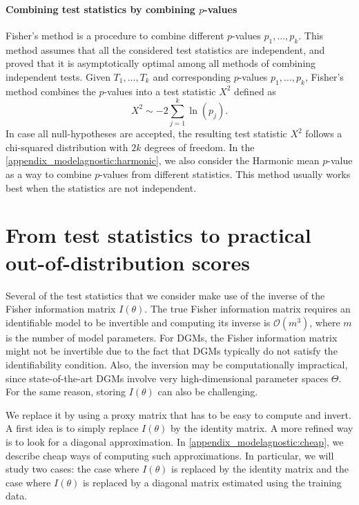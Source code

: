 {\paragraph{Combining test statistics by combining $p$-values}
Fisher's \citeyearpar{fisher_statistical_1925} method is a procedure to combine different $p$-values $p_1,\dots, p_k$. This method assumes that all the considered test statistics are independent, and \textcite{folks_asymptotic_1971} proved that it is asymptotically optimal among all methods of combining independent tests.
%
Given $T_1,\dots, T_k$ and corresponding $p$-values $p_1,\dots, p_k$, Fisher's method combines the $p$-values into a test statistic $X^2$ defined as
\begin{equation}
    \label{eq_modelagnostic:Fisher_method}
    X^2 \sim -2 \sum_{j=1}^{k} \ln (p_j).
\end{equation}
In case all null-hypotheses are accepted, the resulting test statistic $X^2$ follows a chi-squared distribution with $2k$ degrees of freedom. 
%
In the \cref{appendix_modelagnostic:harmonic}, we also consider the Harmonic mean $p$-value \parencite{wilson_harmonic_2019} as a way to combine $p$-values from different statistics. This method usually works best when the statistics are not independent.

\section{From test statistics to practical out-of-distribution scores}
\label{sec_modelagnostic:section4}

Several of the test statistics that we consider make use of the inverse of the Fisher information matrix $I(\theta)$. The true Fisher information matrix requires an identifiable model to be invertible \parencite{watanabe_algebraic_2009} and computing its inverse is $\mathcal{O}(m^3)$, where $m$ is the number of model parameters. For DGMs, the Fisher information matrix might not be invertible due to the fact that DGMs typically do not satisfy the identifiability condition. Also, the inversion may be computationally impractical, since state-of-the-art DGMs involve very high-dimensional parameter spaces $\Theta$. For the same reason, storing $I(\theta)$ can also be challenging.

We replace it by using a proxy matrix that has to be easy to compute and invert. A first idea is to simply replace $I(\theta)$ by the identity matrix. A more refined way is to look for a diagonal approximation. In \cref{appendix_modelagnostic:cheap}, we describe cheap ways of computing such approximations. In particular, we will study two cases: the case where $I(\theta)$ is replaced by the identity matrix and the case where $I(\theta)$ is replaced by a diagonal matrix estimated using the training data.

}
